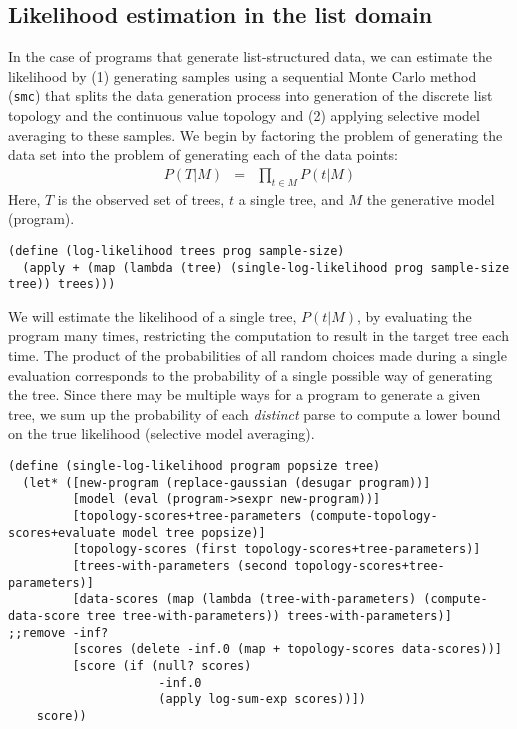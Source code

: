 \documentclass[a4paper,10pt]{article}
\begin{document}
\subsection{Likelihood estimation in the list domain}

In the case of programs that generate list-structured data, we can estimate the likelihood by (1) generating samples using a sequential Monte Carlo method (\texttt{smc}) that splits the data generation process into generation of the discrete list topology and the continuous value topology and (2) applying selective model averaging to these samples. We begin by factoring the problem of generating the data set into the problem of generating each of the data points:
\begin{eqnarray}
P(T|M) &=& \prod_{t \in M}P(t|M)
\end{eqnarray}
Here, $T$ is the observed set of trees, $t$ a single tree, and $M$ the generative model (program).
\begin{lstlisting}[frame=trbl]
(define (log-likelihood trees prog sample-size)
  (apply + (map (lambda (tree) (single-log-likelihood prog sample-size tree)) trees)))
\end{lstlisting}
We will estimate the likelihood of a single tree, $P(t|M)$, by evaluating the program many times, restricting the computation to result in the target tree each time. The product of the probabilities of all random choices made during a single evaluation corresponds to the probability of a single possible way of generating the tree. Since there may be multiple ways for a program to generate a given tree, we sum up the probability of each {\em distinct} parse to compute a lower bound on the true likelihood (selective model averaging).
\begin{lstlisting}[frame=trbl]
(define (single-log-likelihood program popsize tree)
  (let* ([new-program (replace-gaussian (desugar program))]
         [model (eval (program->sexpr new-program))]
         [topology-scores+tree-parameters (compute-topology-scores+evaluate model tree popsize)]
         [topology-scores (first topology-scores+tree-parameters)]
         [trees-with-parameters (second topology-scores+tree-parameters)]
         [data-scores (map (lambda (tree-with-parameters) (compute-data-score tree tree-with-parameters)) trees-with-parameters)] ;;remove -inf?
         [scores (delete -inf.0 (map + topology-scores data-scores))]
         [score (if (null? scores)
                     -inf.0
                     (apply log-sum-exp scores))])
    score))
\end{lstlisting}
\end{document}
